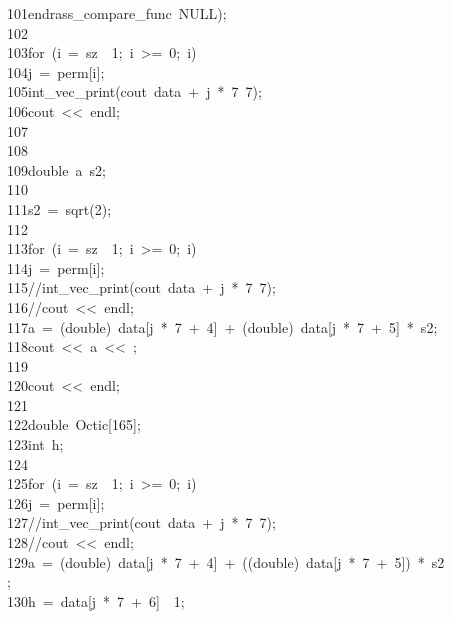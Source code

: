 \begin{tabbing}
101\>\>\>\>endrass\_compare\_func\ NULL);\\[0pt]
102\>\\[0pt]
103\>\>for\ (i\ =\ sz\ \ 1;\ i\ >=\ 0;\ i)\ \\[0pt]
104\>\>\>j\ =\ perm[i];\\[0pt]
105\>\>\>int\_vec\_print(cout\ data\ +\ j\ *\ 7\ 7);\\[0pt]
106\>\>\>cout\ <<\ endl;\\[0pt]
107\>\>\\[0pt]
108\>\\[0pt]
109\>\>double\ a\ s2;\\[0pt]
110\>\\[0pt]
111\>\>s2\ =\ sqrt(2);\\[0pt]
112\>\\[0pt]
113\>\>for\ (i\ =\ sz\ \ 1;\ i\ >=\ 0;\ i)\ \\[0pt]
114\>\>\>j\ =\ perm[i];\\[0pt]
115\>\>\>//int\_vec\_print(cout\ data\ +\ j\ *\ 7\ 7);\\[0pt]
116\>\>\>//cout\ <<\ endl;\\[0pt]
117\>\>\>a\ =\ (double)\ data[j\ *\ 7\ +\ 4]\ +\ (double)\ data[j\ *\ 7\ +\ 5]\ *\ s2;\\[0pt]
118\>\>\>cout\ <<\ a\ <<\ ;\\[0pt]
119\>\>\\[0pt]
120\>\>cout\ <<\ endl;\\[0pt]
121\>\\[0pt]
122\>\>double\ Octic[165];\\[0pt]
123\>\>int\ h;\\[0pt]
124\>\\[0pt]
125\>\>for\ (i\ =\ sz\ \ 1;\ i\ >=\ 0;\ i)\ \\[0pt]
126\>\>\>j\ =\ perm[i];\\[0pt]
127\>\>\>//int\_vec\_print(cout\ data\ +\ j\ *\ 7\ 7);\\[0pt]
128\>\>\>//cout\ <<\ endl;\\[0pt]
129\>\>\>a\ =\ (double)\ data[j\ *\ 7\ +\ 4]\ +\ ((double)\ data[j\ *\ 7\ +\ 5])\ *\ s2\\[0pt]
\>;\\[0pt]
130\>\>\>h\ =\ data[j\ *\ 7\ +\ 6]\ \ 1;\\[0pt]

\end{tabbing}
